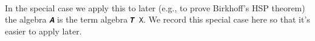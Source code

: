 \begin{code}
\AgdaSpace{}%
\AgdaSpace{}%
\AgdaSpace{}%
\AgdaSpace{}%
\AgdaSpace{}%
\AgdaSpace{}%
\AgdaSpace{}%
\AgdaSpace{}%
\<%
\\
%
\\[\AgdaEmptyExtraSkip]%
%
\>[1]\AgdaSpace{}%
\AgdaSymbol{=}\AgdaSpace{}%
\AgdaSpace{}%
\AgdaSymbol{\{}\AgdaSpace{}%
\AgdaSymbol{=}\AgdaSpace{}%
\AgdaSymbol{\}\{}\AgdaSpace{}%
\AgdaSymbol{=}\AgdaSpace{}%
\AgdaSymbol{\}\{}\AgdaSymbol{\}}\AgdaSpace{}%
\AgdaSymbol{\{}\AgdaSymbol{\}}\AgdaSpace{}%
\AgdaSymbol{\{}\AgdaSymbol{\}\{}\AgdaSymbol{\}\{}\AgdaSymbol{\}}\<%
\\
%
\\[\AgdaEmptyExtraSkip]%
%
\>[1]\AgdaSpace{}%
\AgdaSymbol{:}\AgdaSpace{}%
\AgdaSpace{}%
\AgdaSymbol{(}\AgdaSpace{}%
\AgdaOperator{\AgdaFunction{[}}\AgdaSpace{}%
\AgdaSpace{}%
\AgdaOperator{\AgdaFunction{]/ker}}\AgdaSpace{}%
\AgdaSymbol{)}\AgdaSpace{}%
\<%
\\
%
\>[1]\AgdaSpace{}%
\AgdaSymbol{=}\AgdaSpace{}%
\AgdaSpace{}%
\AgdaSpace{}%
\<%
\\
%
\\[\AgdaEmptyExtraSkip]%
%
\>[1]\AgdaSpace{}%
\AgdaSymbol{:}\AgdaSpace{}%
\AgdaSpace{}%
\AgdaSpace{}%
\AgdaSpace{}%
\<%
\\
%
\>[1]\AgdaSpace{}%
\AgdaSymbol{=}\AgdaSpace{}%
\AgdaSpace{}%
\AgdaSymbol{(}\AgdaSpace{}%
\AgdaSymbol{(}\AgdaSpace{}%
\AgdaSymbol{))}\<%
\end{code}
\ccpad
In the special case we apply this to later (e.g., to prove Birkhoff's
HSP theorem) the algebra \texttt{𝑨} is the term algebra \texttt{𝑻\ X}.
We record this special case here so that it's easier to apply later.
\ccpad
